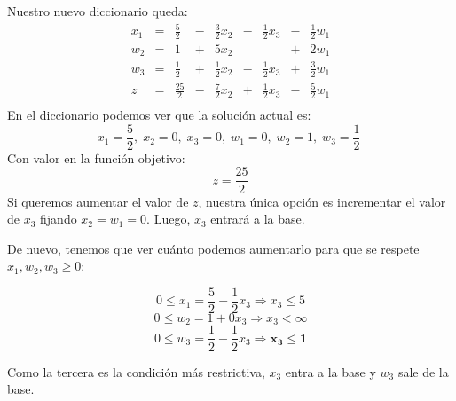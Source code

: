 \documentclass[10pt, aspectratio=169]{beamer}
\begin{document}
    \begin{frame}{}
        Nuestro nuevo diccionario queda:
        \[
            \begin{array}{rrrrrrrrr}
                x_1 & = & \frac{5}{2}  & - & \frac{3}{2}x_2 & - & \frac{1}{2}x_3 & - & \frac{1}{2} w_1 \\
                w_2 & = & 1            & + & 5x_2           &   &                & + & 2w_1            \\
                w_3 & = & \frac{1}{2}  & + & \frac{1}{2}x_2 & - & \frac{1}{2}x_3 & + & \frac{3}{2}w_1  \\\hline
                z   & = & \frac{25}{2} & - & \frac{7}{2}x_2 & + & \frac{1}{2}x_3 & - & \frac{5}{2}w_1  \\
            \end{array}
        \]
        En el diccionario podemos ver que la solución actual es:
        \[x_1=\frac{5}{2},\; x_2=0,\; x_3=0,\; w_1=0,\; w_2=1,\; w_3=\frac{1}{2}\;\]
        Con valor en la función objetivo:
        \[z=\frac{25}{2}\]\pause
        Si queremos aumentar el valor de $z$, nuestra única opción es incrementar el valor de $x_3$ fijando $x_2=w_1=0$.
        Luego, $x_3$ entrará a la base.
    \end{frame}

    \begin{frame}
        De nuevo, tenemos que ver cuánto podemos aumentarlo para que se respete $x_1, w_2, w_3 \geq 0$:

        \[ 0\leq x_1 = \frac{5}{2}-\frac{1}{2}x_3 \Rightarrow x_3 \leq 5 \]
        \[ 0\leq w_2 = 1+0x_3 \Rightarrow x_3 < \infty \]
        \[ 0\leq w_3 = \frac{1}{2}-\frac{1}{2}x_3 \Rightarrow \mathbf{x_3 \leq 1} \]

        Como la tercera es la condición más restrictiva, $x_3$ entra a la base y $w_3$ sale de la base.
    \end{frame}
\end{document}
